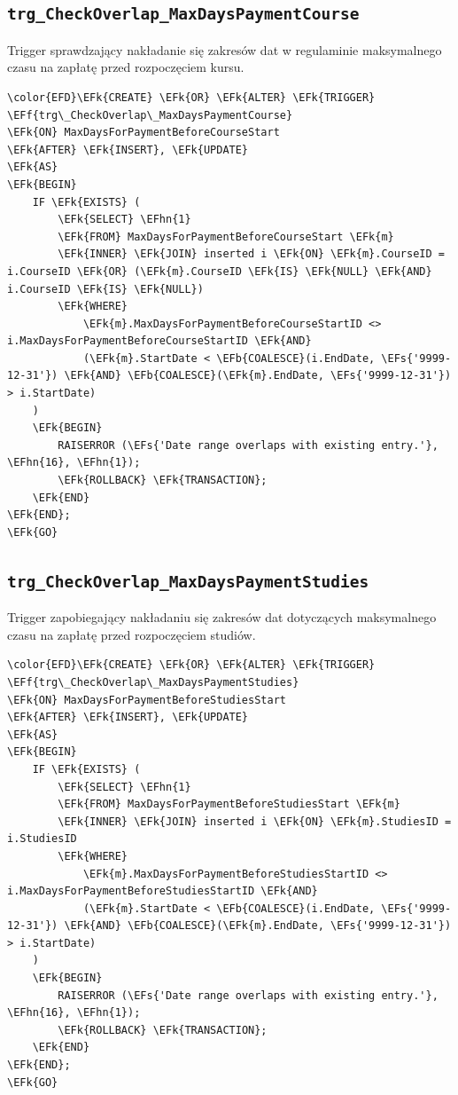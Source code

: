 \documentclass[11pt]{article}
\newcommand{\EFs}[1]{\textcolor{EFs}{#1}} %
\newcommand{\EFk}[1]{\textcolor{EFk}{\textbf{#1}}} %
\newcommand{\EFb}[1]{\textcolor{EFb}{\textbf{#1}}} %
\newcommand{\EFf}[1]{\textcolor{EFf}{#1}} %
\newcommand{\EFhn}[1]{\textcolor{EFhn}{#1}} %
\begin{document}
\subsection{\texttt{trg\_CheckOverlap\_MaxDaysPaymentCourse}}
\label{sec:org3a84c2b}
Trigger sprawdzający nakładanie się zakresów dat w regulaminie maksymalnego czasu na zapłatę przed rozpoczęciem kursu.
\begin{Code}
\begin{Verbatim}
\color{EFD}\EFk{CREATE} \EFk{OR} \EFk{ALTER} \EFk{TRIGGER} \EFf{trg\_CheckOverlap\_MaxDaysPaymentCourse}
\EFk{ON} MaxDaysForPaymentBeforeCourseStart
\EFk{AFTER} \EFk{INSERT}, \EFk{UPDATE}
\EFk{AS}
\EFk{BEGIN}
    IF \EFk{EXISTS} (
        \EFk{SELECT} \EFhn{1} 
        \EFk{FROM} MaxDaysForPaymentBeforeCourseStart \EFk{m}
        \EFk{INNER} \EFk{JOIN} inserted i \EFk{ON} \EFk{m}.CourseID = i.CourseID \EFk{OR} (\EFk{m}.CourseID \EFk{IS} \EFk{NULL} \EFk{AND} i.CourseID \EFk{IS} \EFk{NULL})
        \EFk{WHERE} 
            \EFk{m}.MaxDaysForPaymentBeforeCourseStartID <> i.MaxDaysForPaymentBeforeCourseStartID \EFk{AND}
            (\EFk{m}.StartDate < \EFb{COALESCE}(i.EndDate, \EFs{'9999-12-31'}) \EFk{AND} \EFb{COALESCE}(\EFk{m}.EndDate, \EFs{'9999-12-31'}) > i.StartDate)
    )
    \EFk{BEGIN}
        RAISERROR (\EFs{'Date range overlaps with existing entry.'}, \EFhn{16}, \EFhn{1});
        \EFk{ROLLBACK} \EFk{TRANSACTION};
    \EFk{END}
\EFk{END};
\EFk{GO}
\end{Verbatim}
\end{Code}
\subsection{\texttt{trg\_CheckOverlap\_MaxDaysPaymentStudies}}
\label{sec:org06fc79a}
Trigger zapobiegający nakładaniu się zakresów dat dotyczących maksymalnego czasu na zapłatę przed rozpoczęciem studiów.
\begin{Code}
\begin{Verbatim}
\color{EFD}\EFk{CREATE} \EFk{OR} \EFk{ALTER} \EFk{TRIGGER} \EFf{trg\_CheckOverlap\_MaxDaysPaymentStudies}
\EFk{ON} MaxDaysForPaymentBeforeStudiesStart
\EFk{AFTER} \EFk{INSERT}, \EFk{UPDATE}
\EFk{AS}
\EFk{BEGIN}
    IF \EFk{EXISTS} (
        \EFk{SELECT} \EFhn{1} 
        \EFk{FROM} MaxDaysForPaymentBeforeStudiesStart \EFk{m}
        \EFk{INNER} \EFk{JOIN} inserted i \EFk{ON} \EFk{m}.StudiesID = i.StudiesID
        \EFk{WHERE} 
            \EFk{m}.MaxDaysForPaymentBeforeStudiesStartID <> i.MaxDaysForPaymentBeforeStudiesStartID \EFk{AND}
            (\EFk{m}.StartDate < \EFb{COALESCE}(i.EndDate, \EFs{'9999-12-31'}) \EFk{AND} \EFb{COALESCE}(\EFk{m}.EndDate, \EFs{'9999-12-31'}) > i.StartDate)
    )
    \EFk{BEGIN}
        RAISERROR (\EFs{'Date range overlaps with existing entry.'}, \EFhn{16}, \EFhn{1});
        \EFk{ROLLBACK} \EFk{TRANSACTION};
    \EFk{END}
\EFk{END};
\EFk{GO}
\end{Verbatim}
\end{Code}
\end{document}
